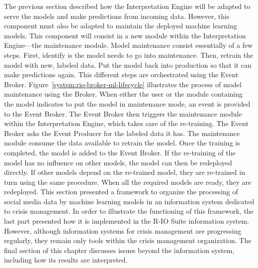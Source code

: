 The previous section described how the Interpretation Engine will be adapted to serve the models and make predictions from incoming data.
However, this component must also be adapted to maintain the deployed machine learning models.
This component will consist in a new module within the Interpretation Engine—the maintenance module.
Model maintenance consist essentially of a few steps.
First, identify is the model needs to go into maintenance.
Then, retrain the model with new, labeled data.
Put the model back into production so that it can make predictions again.
This different steps are orchestrated using the Event Broker.
Figure~\ref{system:rio-broker-ml-lifecycle} illustrates the process of model maintenance using the Broker.
When either the user or the module containing the model indicates to put the model in maintenance mode, an event is provided to the Event Broker.
The Event Broker then triggers the maintenance module within the Interpretation Engine, which takes care of the re-training.
The Event Broker asks the Event Producer for the labeled data it has.
The maintenance module consume the data available to retrain the model.
Once the training is completed, the model is added to the Event Broker.
If the re-training of the model has no influence on other models, the model can then be redeployed directly.
If other models depend on the re-trained model, they are re-trained in turn using the same procedure.
When all the required models are ready, they are redeployed.
This section presented a framework to organize the processing of social media data by machine learning models in an information system dedicated to crisis management.
In order to illustrate the functioning of this framework, the last part presented how it is implemented in the R-IO Suite information system.
However, although information systems for crisis management are progressing regularly, they remain only tools within the crisis management organization.
The final section of this chapter discusses issues beyond the information system, including how its results are interpreted.

